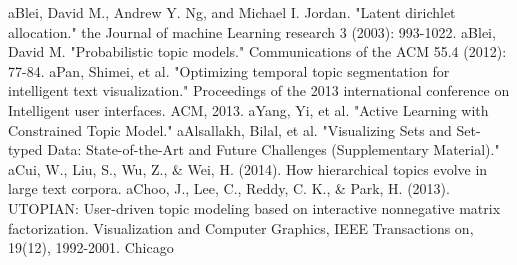 \documentclass[10pt,journal,compsoc]{IEEEtran}
\begin{document}
\begin{thebibliography}{1}
\bibitem aBlei, David M., Andrew Y. Ng, and Michael I. Jordan. "Latent dirichlet allocation." the Journal of machine Learning research 3 (2003): 993-1022.
\bibitem aBlei, David M. "Probabilistic topic models." Communications of the ACM 55.4 (2012): 77-84.
\bibitem aPan, Shimei, et al. "Optimizing temporal topic segmentation for intelligent text visualization." Proceedings of the 2013 international conference on Intelligent user interfaces. ACM, 2013.
\bibitem aYang, Yi, et al. "Active Learning with Constrained Topic Model."
\bibitem aAlsallakh, Bilal, et al. "Visualizing Sets and Set-typed Data: State-of-the-Art and Future Challenges (Supplementary Material)."
\bibitem aCui, W., Liu, S., Wu, Z., \& Wei, H. (2014). How hierarchical topics evolve in large text corpora.
\bibitem aChoo, J., Lee, C., Reddy, C. K., \& Park, H. (2013). UTOPIAN: User-driven topic modeling based on interactive nonnegative matrix factorization. Visualization and Computer Graphics, IEEE Transactions on, 19(12), 1992-2001.
Chicago	

\end{thebibliography}

% 






\end{document}
